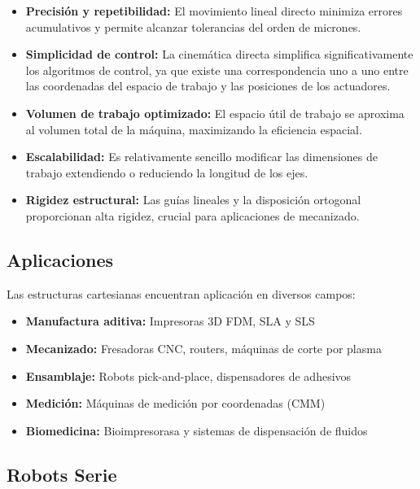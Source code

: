 \begin{itemize}
    \item \textbf{Precisión y repetibilidad:} El movimiento lineal directo minimiza errores acumulativos y permite alcanzar tolerancias del orden de micrones.
    
    \item \textbf{Simplicidad de control:} La cinemática directa simplifica significativamente los algoritmos de control, ya que existe una correspondencia uno a uno entre las coordenadas del espacio de trabajo y las posiciones de los actuadores.
    
    \item \textbf{Volumen de trabajo optimizado:} El espacio útil de trabajo se aproxima al volumen total de la máquina, maximizando la eficiencia espacial.
    
    \item \textbf{Escalabilidad:} Es relativamente sencillo modificar las dimensiones de trabajo extendiendo o reduciendo la longitud de los ejes.
    
    \item \textbf{Rigidez estructural:} Las guías lineales y la disposición ortogonal proporcionan alta rigidez, crucial para aplicaciones de mecanizado.
\end{itemize}

\subsection{Aplicaciones}

Las estructuras cartesianas encuentran aplicación en diversos campos:

\begin{itemize}
    \item \textbf{Manufactura aditiva:} Impresoras 3D FDM, SLA y SLS
    \item \textbf{Mecanizado:} Fresadoras CNC, routers, máquinas de corte por plasma
    \item \textbf{Ensamblaje:} Robots pick-and-place, dispensadores de adhesivos
    \item \textbf{Medición:} Máquinas de medición por coordenadas (CMM)
    \item \textbf{Biomedicina:} Bioimpresorasa y sistemas de dispensación de fluidos
\end{itemize}

\subsection{Robots Serie}

